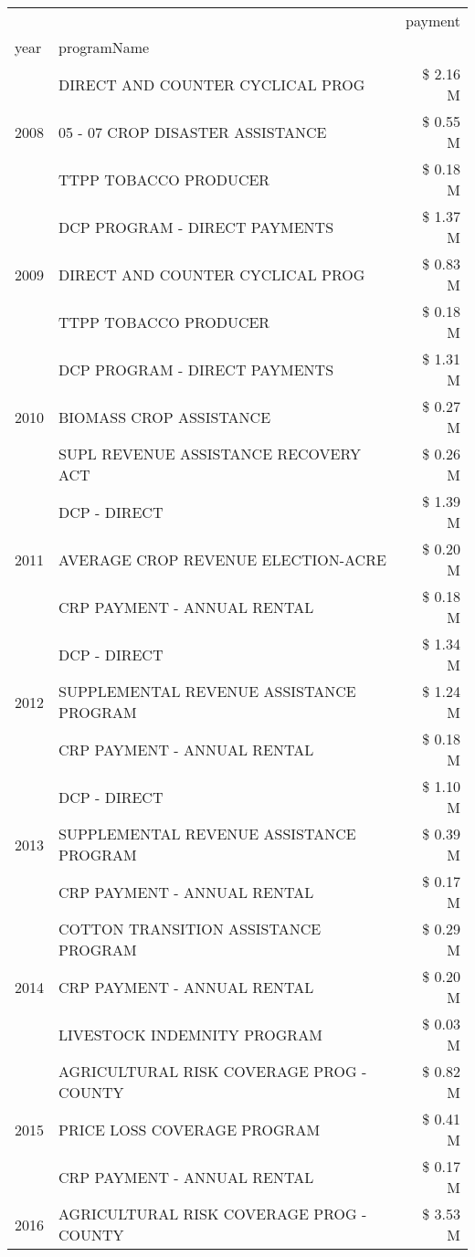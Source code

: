 \begin{tabular}{llr}
\toprule
 &  & payment \\
year & programName &  \\
\midrule
\multirow[t]{3}{*}{2008} & DIRECT AND COUNTER CYCLICAL PROG & \$ 2.16 M \\
 & 05 - 07 CROP DISASTER ASSISTANCE & \$ 0.55 M \\
 & TTPP TOBACCO PRODUCER & \$ 0.18 M \\
\cline{1-3}
\multirow[t]{3}{*}{2009} & DCP PROGRAM - DIRECT PAYMENTS & \$ 1.37 M \\
 & DIRECT AND COUNTER CYCLICAL PROG & \$ 0.83 M \\
 & TTPP TOBACCO PRODUCER & \$ 0.18 M \\
\cline{1-3}
\multirow[t]{3}{*}{2010} & DCP PROGRAM - DIRECT PAYMENTS & \$ 1.31 M \\
 & BIOMASS CROP ASSISTANCE & \$ 0.27 M \\
 & SUPL REVENUE ASSISTANCE RECOVERY ACT & \$ 0.26 M \\
\cline{1-3}
\multirow[t]{3}{*}{2011} & DCP - DIRECT & \$ 1.39 M \\
 & AVERAGE CROP REVENUE ELECTION-ACRE & \$ 0.20 M \\
 & CRP PAYMENT - ANNUAL RENTAL & \$ 0.18 M \\
\cline{1-3}
\multirow[t]{3}{*}{2012} & DCP - DIRECT & \$ 1.34 M \\
 & SUPPLEMENTAL REVENUE ASSISTANCE PROGRAM & \$ 1.24 M \\
 & CRP PAYMENT - ANNUAL RENTAL & \$ 0.18 M \\
\cline{1-3}
\multirow[t]{3}{*}{2013} & DCP - DIRECT & \$ 1.10 M \\
 & SUPPLEMENTAL REVENUE ASSISTANCE PROGRAM & \$ 0.39 M \\
 & CRP PAYMENT - ANNUAL RENTAL & \$ 0.17 M \\
\cline{1-3}
\multirow[t]{3}{*}{2014} & COTTON TRANSITION ASSISTANCE PROGRAM & \$ 0.29 M \\
 & CRP PAYMENT - ANNUAL RENTAL & \$ 0.20 M \\
 & LIVESTOCK INDEMNITY PROGRAM & \$ 0.03 M \\
\cline{1-3}
\multirow[t]{3}{*}{2015} & AGRICULTURAL RISK COVERAGE PROG - COUNTY & \$ 0.82 M \\
 & PRICE LOSS COVERAGE PROGRAM & \$ 0.41 M \\
 & CRP PAYMENT - ANNUAL RENTAL & \$ 0.17 M \\
\cline{1-3}
\multirow[t]{3}{*}{2016} & AGRICULTURAL RISK COVERAGE PROG - COUNTY & \$ 3.53 M \\

\end{tabular}
